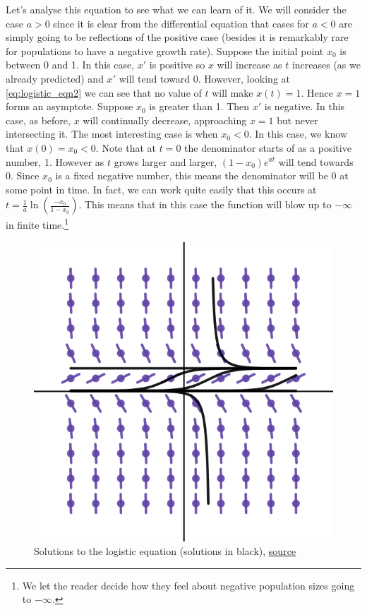 Let's analyse this equation to see what we can learn of it. We will consider the case $a > 0$ since it is clear from the differential equation that cases for $a < 0$ are simply going to be reflections of the positive case (besides it is remarkably rare for populations to have a negative growth rate). Suppose the initial point $x_0$ is between 0 and 1. In this case, $x'$ is positive so $x$ will increase as $t$ increases (as we already predicted) and $x'$ will tend toward 0. However, looking at \eqref{eq:logistic_eqn2} we can see that no value of $t$ will make $x(t) = 1$. Hence $x = 1$ forms an asymptote. Suppose $x_0$ is greater than 1. Then $x'$ is negative. In this case, as before, $x$ will continually decrease, approaching $x = 1$ but never intersecting it. The most interesting case is when $x_0 < 0$. In this case, we know that $x(0) = x_0 < 0$. Note that at $t = 0$ the denominator starts of as a positive number, 1. However as $t$ grows larger and larger, $(1 - x_0) e^{at}$ will tend towards 0. Since $x_0$ is a fixed negative number, this means the denominator will be 0 at some point in time. In fact, we can work quite easily that this occurs at $t = \frac{1}{a}\ln(\frac{-x_0}{1 - x_0})$. This means that in this case the function will blow up to $-\infty$ in finite time.\footnote{We let the reader decide how they feel about negative population sizes going to $-\infty$.}

\begin{figure}[ht]
    \centering
    \includegraphics[scale=0.4]{Images/logistic_eqn_soln.png}
    \caption{Solutions to the logistic equation (solutions in black), \href{https://www.desmos.com/calculator/2lnjgksatt}{source}}
    \label{fig:logistic_eqn_solns}
\end{figure}

